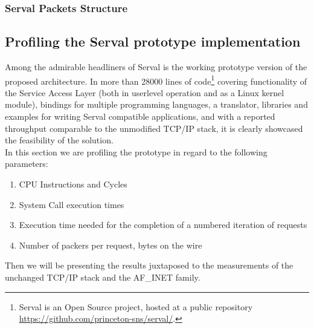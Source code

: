 \subsubsection{Serval Packets Structure}



\subsection{Profiling the Serval prototype implementation}
Among the admirable headliners of Serval is the working prototype version of the proposed architecture.
In more than 28000 lines of code\footnote{Serval is an Open Source project, hosted at a public repository\\ \url{https://github.com/princeton-sns/serval/}.} covering functionality of the Service Access Layer (both in userlevel operation and as a Linux kernel module), bindings for multiple programming languages, a translator, libraries and examples for writing Serval compatible applications, and with a reported throughput comparable to the unmodified TCP/IP stack, it is clearly showcased the feasibility of the solution.
\\ \indent In this section we are profiling the prototype in regard to the following parameters:
\begin{enumerate}
  \item CPU Instructions and Cycles
  \item System Call execution times
  \item Execution time needed for the completion of a numbered iteration of requests
  \item Number of packers per request, bytes on the wire
\end{enumerate}
Then we will be presenting the results juxtaposed to the measurements of the unchanged TCP/IP stack and the AF\_INET family.

